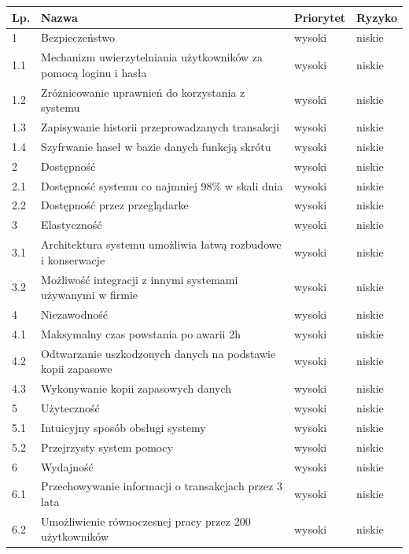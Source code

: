 \begin{table}[h]
	\begin{center}
		\begin{tabular}{| l | l | l | l |}
			\hline
			\textbf{Lp.} & \textbf{Nazwa} & \textbf{Priorytet} & \textbf{Ryzyko} \\
			\hline
			1 & Bezpieczeństwo & wysoki & niskie \\
			1.1 & Mechanizm uwierzytelniania użytkowników za pomocą loginu i hasła &
			wysoki & niskie \\
			1.2 & Zróżnicowanie uprawnień do korzystania z systemu & wysoki & niskie \\
			1.3 & Zapisywanie historii przeprowadzanych transakcji & wysoki & niskie \\
			1.4 & Szyfrwanie haseł w bazie danych funkcją skrótu & wysoki & niskie \\
			\hline
			2 & Dostępność & wysoki & niskie \\
			2.1 & Dostępność systemu co najmniej 98\% w skali dnia & wysoki & niskie \\ 
			2.2 & Dostępność przez przeglądarke & wysoki & niskie \\
			\hline
			3 & Elastyczność & wysoki & niskie \\
			3.1 & Architektura systemu umożliwia łatwą rozbudowe i konserwacje & wysoki &
			niskie \\
			3.2 & Możliwość integracji z innymi systemami używanymi w firmie & wysoki &
			niskie \\
			
			\hline
			4 & Niezawodność & wysoki & niskie \\
			4.1 & Maksymalny czas powstania po awarii 2h & wysoki & niskie \\
			4.2 & Odtwarzanie uszkodzonych danych na podstawie kopii zapasowe & wysoki &
			niskie \\
			4.3 & Wykonywanie kopii zapasowych danych & wysoki & niskie \\
			\hline
			5 & Użyteczność & wysoki & niskie \\
			5.1 & Intuicyjny sposób obsługi systemy & wysoki & niskie \\
			5.2 & Przejrzysty system pomocy & wysoki & niskie \\
			\hline
			6 & Wydajność & wysoki & niskie \\
			6.1 & Przechowywanie informacji o transakcjach przez 3 lata & wysoki & niskie
			\\
			6.2 & Umożliwienie równoczesnej pracy przez 200 użytkowników & wysoki &
			niskie
			\\
			\hline
		\end{tabular}
	\end{center}
\end{table}
\FloatBarrier

